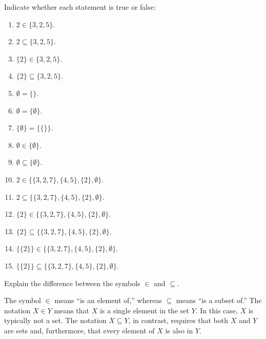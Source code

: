 \documentclass[nooutcomes]{ximera}
\begin{document}
\begin{problem}
Indicate whether each statement is true or false: 
\begin{enumerate}
\item $2\in \{3, 2, 5\}$. 
\item $2\subseteq \{3, 2, 5\}$. 
\item $\{2\}\in \{3, 2, 5\}$.  
\item $\{2\}\subseteq \{3, 2, 5\}$.  
\item $\emptyset = \{ \}$. 
\item $\emptyset = \{ \emptyset \} $. 
\item $\{ \emptyset \} = \{\{\}\}$. 
\item $\emptyset \in \{ \emptyset \} $. 
\item $\emptyset \subseteq \{ \emptyset \} $. 
\item $2 \in \{ \{3,2,7\}, \{4,5\}, \{2\}, \emptyset \}$. 
\item $2 \subseteq \{ \{3,2,7\}, \{4,5\}, \{2\}, \emptyset \}$. 
\item $\{2\} \in \{ \{3,2,7\}, \{4,5\}, \{2\}, \emptyset \}$. 
\item $\{2\} \subseteq \{ \{3,2,7\}, \{4,5\}, \{2\}, \emptyset \}$. 
\item $\{\{2\}\} \in \{ \{3,2,7\}, \{4,5\}, \{2\}, \emptyset \}$. 
\item $\{\{2\}\} \subseteq \{ \{3,2,7\}, \{4,5\}, \{2\}, \emptyset \}$. 
\end{enumerate}

\end{problem}

\begin{problem}
Explain the difference between the symbols $\in$ and $\subseteq$.
\begin{freeResponse}
\begin{hint}
The symbol $\in$ means ``is an element of,'' whereas $\subseteq$ means ``is a subset of.'' 
The notation $X \in Y$ means that $X$ is a single element in the set $Y$.  In this case, $X$ is typically not a set.  The notation $X \subseteq Y$, in contrast, requires that both $X$ and $Y$ are sets and, furthermore, that every element of $X$ is also in $Y$.
\end{hint}
\end{freeResponse}
\end{problem}
\end{document}
